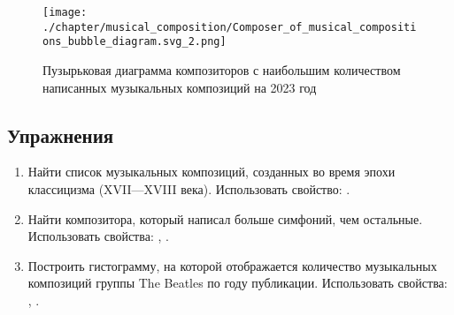 \begin{figure*}
	\texttt{[image: ./chapter/musical\_composition/Composer\_of\_musical\_compositions\_bubble\_diagram.svg\_2.png]}
	\caption[Пузырьковая диаграмма композиторов с наибольшим количеством написанных музыкальных композиций на 2023 год]{Пузырьковая диаграмма композиторов с наибольшим количеством написанных музыкальных композиций на 2023 год}%
	\label{fig:bubbleChart3}%
\end{figure*}

\newpage

\subsection{Упражнения}
\begin{enumerate}
\item Найти список музыкальных композиций, созданных во время эпохи классицизма (XVII—XVIII века).
Использовать свойство: .
\item Найти композитора, который написал больше симфоний, чем остальные.
Использовать свойства: , .
\item Построить гистограмму, на которой отображается количество музыкальных композиций группы The Beatles по году публикации.
Использовать свойства: , .
\end{enumerate}
